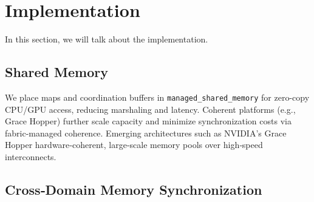 \section{\sys{} Implementation}
In this section, we will talk about the \sys implementation.
\label{sec:design}


\subsection{Shared Memory}

We place maps and coordination buffers in \texttt{managed\_shared\_memory} for zero-copy CPU/GPU access, reducing marshaling and latency. Coherent platforms (e.g., Grace Hopper) further scale capacity and minimize synchronization costs via fabric-managed coherence. Emerging architectures such as NVIDIA's Grace Hopper  hardware‐coherent, large‐scale memory pools over high‐speed interconnects.


\subsection{Cross‐Domain Memory Synchronization}

